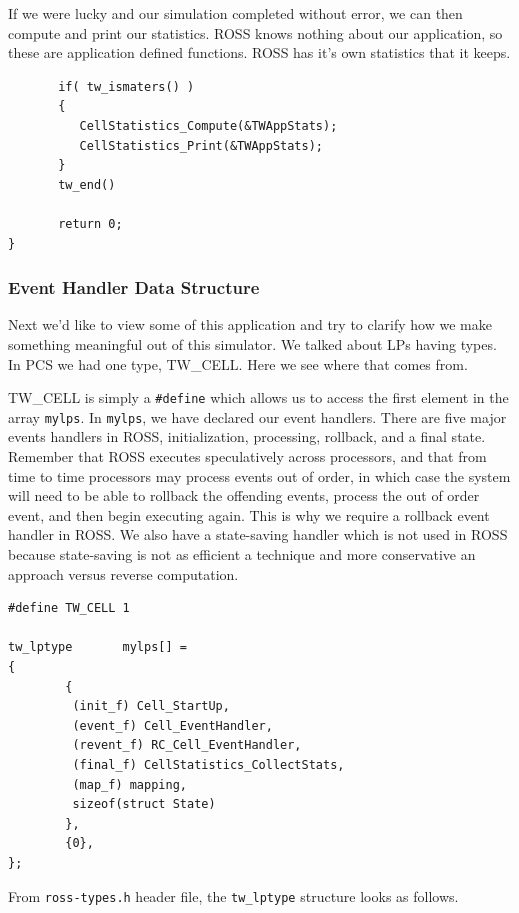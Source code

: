\documentclass[12pt]{article}
\begin{document}
If we were lucky and our simulation completed without error, we can then
compute and print our statistics.  ROSS knows nothing about our application,
so these are application defined functions.  ROSS has it's own statistics that
it keeps.

\begin{verbatim}
       if( tw_ismaters() )
       {
          CellStatistics_Compute(&TWAppStats);
          CellStatistics_Print(&TWAppStats);
       }
       tw_end()

       return 0;
}
\end{verbatim}
 
\subsubsection{Event Handler Data Structure}
Next we'd like to view some of this application and try to clarify how we make
something meaningful out of this simulator.  We talked about LPs having types.
In PCS we had one type, TW\_CELL.  Here we see where that comes from.

TW\_CELL is simply a {\tt \#define} which allows us to access the first
element in the array {\tt mylps}.  In {\tt mylps}, we have declared our event
handlers.  There are five major events handlers in ROSS, initialization,
processing, rollback, and a final state.  Remember that ROSS executes
speculatively across processors, and that from time to time processors may
process events out of order, in which case the system will need to be able to
rollback the offending events, process the out of order event, and then begin
executing again.  This is why we require a rollback event handler in ROSS.  We
also have a state-saving handler which is not used in ROSS because
state-saving is not as efficient a technique and more conservative an approach
versus reverse computation.

\begin{verbatim}
#define TW_CELL 1

tw_lptype       mylps[] =
{
        {
         (init_f) Cell_StartUp,
         (event_f) Cell_EventHandler,
         (revent_f) RC_Cell_EventHandler,
         (final_f) CellStatistics_CollectStats,
         (map_f) mapping,
         sizeof(struct State)
        },
        {0},
};

\end{verbatim}

From {\tt ross-types.h} header file, the {\tt tw\_lptype} structure
looks as follows.
\end{document}
